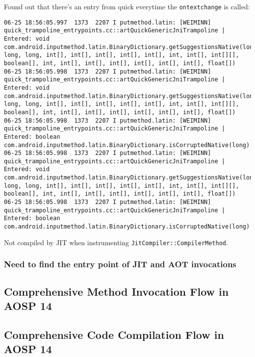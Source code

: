 Found out that there's an entry from quick everytime the \texttt{ontextchange} is called:
\begin{lstlisting}
06-25 18:56:05.997  1373  2207 I putmethod.latin: [WEIMINN] quick_trampoline_entrypoints.cc::artQuickGenericJniTrampoline | Entered: void com.android.inputmethod.latin.BinaryDictionary.getSuggestionsNative(long, long, long, int[], int[], int[], int[], int[], int, int[], int[][], boolean[], int, int[], int[], int[], int[], int[], int[], float[])
06-25 18:56:05.998  1373  2207 I putmethod.latin: [WEIMINN] quick_trampoline_entrypoints.cc::artQuickGenericJniTrampoline | Entered: void com.android.inputmethod.latin.BinaryDictionary.getSuggestionsNative(long, long, long, int[], int[], int[], int[], int[], int, int[], int[][], boolean[], int, int[], int[], int[], int[], int[], int[], float[])
06-25 18:56:05.998  1373  2207 I putmethod.latin: [WEIMINN] quick_trampoline_entrypoints.cc::artQuickGenericJniTrampoline | Entered: boolean com.android.inputmethod.latin.BinaryDictionary.isCorruptedNative(long)
06-25 18:56:05.998  1373  2207 I putmethod.latin: [WEIMINN] quick_trampoline_entrypoints.cc::artQuickGenericJniTrampoline | Entered: void com.android.inputmethod.latin.BinaryDictionary.getSuggestionsNative(long, long, long, int[], int[], int[], int[], int[], int, int[], int[][], boolean[], int, int[], int[], int[], int[], int[], int[], float[])
06-25 18:56:05.998  1373  2207 I putmethod.latin: [WEIMINN] quick_trampoline_entrypoints.cc::artQuickGenericJniTrampoline | Entered: boolean com.android.inputmethod.latin.BinaryDictionary.isCorruptedNative(long)
\end{lstlisting}

Not compiled by JIT when instrumenting \texttt{JitCompiler::CompilerMethod}.

\subsubsection{Need to find the entry point of JIT and AOT invocations}



\subsection{Comprehensive Method Invocation Flow in AOSP 14}

\subsection{Comprehensive Code Compilation Flow in AOSP 14}

